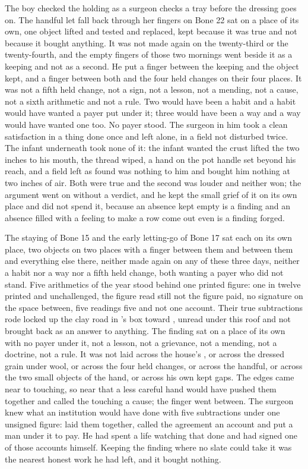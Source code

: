 The boy checked the holding as a surgeon checks a tray before the dressing goes on. The handful let fall back through her fingers on Bone 22 sat on a place of its own, one object lifted and tested and replaced, kept because it was true and not because it bought anything. It was not made again on the twenty-third or the twenty-fourth, and the empty fingers of those two mornings went beside it as a keeping and not as a second. He put a finger between the keeping and the object kept, and a finger between both and the four held changes on their four places. It was not a fifth held change, not a sign, not a lesson, not a mending, not a cause, not a sixth arithmetic and not a rule. Two would have been a habit and a habit would have wanted a payer put under it; three would have been a way and a way would have wanted one too. No payer stood. The surgeon in him took a clean satisfaction in a thing done once and left alone, in a field not disturbed twice. The infant underneath took none of it: the infant wanted the crust lifted the two inches to his mouth, the thread wiped, a hand on the pot handle set beyond his reach, and a field left as found was nothing to him and bought him nothing at two inches of air. Both were true and the second was louder and neither won; the argument went on without a verdict, and he kept the small grief of it on its own place and did not spend it, because an absence kept empty is a finding and an absence filled with a feeling to make a row come out even is a finding forged.

The staying of Bone 15 and the early letting-go of Bone 17 sat each on its own place, two objects on two places with a finger between them and between them and everything else there, neither made again on any of these three days, neither a habit nor a way nor a fifth held change, both wanting a payer who did not stand. Five arithmetics of the year stood behind one printed figure: one in twelve printed and unchallenged, the figure read still not the figure paid, no signature on the space between, five readings five and not one account. Their true subtractions rode locked up the clay road in 's box toward , unread under this roof and not brought back as an answer to anything. The finding sat on a place of its own with no payer under it, not a lesson, not a grievance, not a mending, not a doctrine, not a rule. It was not laid across the house's , or across the dressed grain under wool, or across the four held changes, or across the handful, or across the two small objects of the hand, or across his own kept gaps. The edges came near to touching, so near that a less careful hand would have pushed them together and called the touching a cause; the finger went between. The surgeon knew what an institution would have done with five subtractions under one unsigned figure: laid them together, called the agreement an account and put a man under it to pay. He had spent a life watching that done and had signed one of those accounts himself. Keeping the finding where no slate could take it was the nearest honest work he had left, and it bought nothing.

